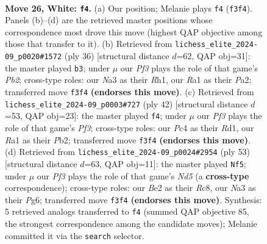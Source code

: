 \documentclass[11pt]{article}
\begin{document}
\clearpage

\begin{figure}[p]\centering
\begin{subfigure}{0.46\textwidth}\centering
\resizebox{\linewidth}{!}{%
\newchessgame
\chessboard[
  setfen={r5k1/pbpp4/1p3n1p/5pp1/2P5/NP3PP1/P2PBK1P/R7 w - - 1 26},
  showmover=false,
  pgfstyle=straightmove, color=movearrow, markmove={f3-f4}
]}
\caption{}
\end{subfigure}\hfill
\begin{subfigure}{0.46\textwidth}\centering
\resizebox{\linewidth}{!}{%
\newchessgame
\chessboard[
  setfen={3k3r/1p2ppb1/p1n3p1/7p/4P2P/4BP2/PP2BP2/4K2R w K - 0 19},
  showmover=false,
  pgfstyle=straightmove, color=movearrow, markmove={b2-b3}
]}
\caption{}
\end{subfigure}
\\[4pt]
\begin{subfigure}{0.46\textwidth}\centering
\resizebox{\linewidth}{!}{%
\newchessgame
\chessboard[
  setfen={r4k2/pb3p2/1p2p2p/1N2n1p1/8/P3PPP1/1P2BK1P/3R4 w - - 1 22},
  showmover=false,
  pgfstyle=straightmove, color=movearrow, markmove={f3-f4}
]}
\caption{}
\end{subfigure}\hfill
\begin{subfigure}{0.46\textwidth}\centering
\resizebox{\linewidth}{!}{%
\newchessgame
\chessboard[
  setfen={2r3k1/5p1p/1p2p1p1/2b1P3/3nBP2/6P1/PP4KP/3RN3 b - - 4 27},
  showmover=false,
  pgfstyle=straightmove, color=movearrow, markmove={d4-f5}
]}
\caption{}
\end{subfigure}
\caption{\textbf{Move 26, White: \texttt{f4}.} (a) Our position; Melanie plays \texttt{f4} (\texttt{f3f4}). Panels (b)--(d) are the retrieved master positions whose correspondence most drove this move (highest QAP objective among those that transfer to it). (b) Retrieved from \texttt{lichess\_elite\_2024-09\_p0020\#1572} (ply 36) [structural distance $d$=62, QAP obj=31]: the master played \texttt{b3}; under $\mu$ our \emph{Pf3} plays the role of that game's \emph{Pb2}; cross-type roles: our \emph{N}a3 as their \emph{R}h1, our \emph{R}a1 as their \emph{P}a2; transferred move \texttt{f3f4} \textbf{(endorses this move)}. (c) Retrieved from \texttt{lichess\_elite\_2024-09\_p0003\#727} (ply 42) [structural distance $d$=53, QAP obj=23]: the master played \texttt{f4}; under $\mu$ our \emph{Pf3} plays the role of that game's \emph{Pf3}; cross-type roles: our \emph{P}c4 as their \emph{R}d1, our \emph{R}a1 as their \emph{P}b2; transferred move \texttt{f3f4} \textbf{(endorses this move)}. (d) Retrieved from \texttt{lichess\_elite\_2024-09\_p0024\#2954} (ply 53) [structural distance $d$=63, QAP obj=11]: the master played \texttt{Nf5}; under $\mu$ our \emph{Pf3} plays the role of that game's \emph{Nd5} (a \textbf{cross-type} correspondence); cross-type roles: our \emph{B}e2 as their \emph{R}c8, our \emph{N}a3 as their \emph{P}g6; transferred move \texttt{f3f4} \textbf{(endorses this move)}. Synthesis: 5 retrieved analogs transferred to \texttt{f4} (summed QAP objective 85, the strongest correspondence among the candidate moves); Melanie committed it via the \texttt{search} selector.}
\label{fig:thought-m50}
\end{figure}
\end{document}
